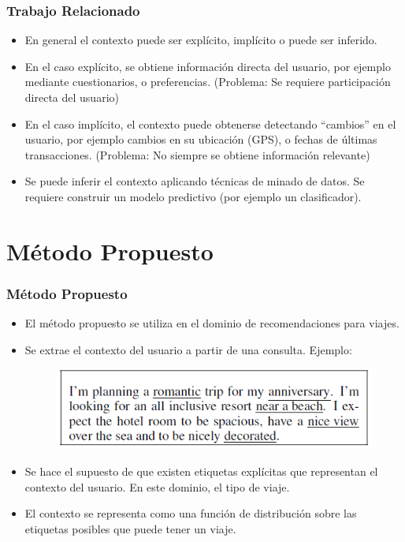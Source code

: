 \documentclass{beamer}
\begin{document}

\begin{frame}
\frametitle{Trabajo Relacionado}
\begin{itemize}
\item En general el contexto puede ser explícito, implícito o puede ser inferido.
\item En el caso explícito, se obtiene información directa del usuario, por ejemplo mediante cuestionarios, o preferencias. (Problema: Se requiere participación directa del usuario)
\item En el caso implícito, el contexto puede obtenerse detectando ``cambios'' en el usuario, por ejemplo cambios en su ubicación (GPS), o fechas de últimas transacciones. (Problema: No siempre se obtiene información relevante)
\item Se puede inferir el contexto aplicando técnicas de minado de datos. Se requiere construir un modelo predictivo (por ejemplo un clasificador).
\end{itemize}

\end{frame}


\section{Método Propuesto}
\begin{frame}
\frametitle{Método Propuesto}
\begin{itemize}
\item El método propuesto se utiliza en el dominio de recomendaciones para viajes.
\item Se extrae el contexto del usuario a partir de una consulta. Ejemplo:

\begin{figure}
\includegraphics[width=0.5\linewidth]{query.png}
\end{figure}

\item Se hace el supuesto de que existen etiquetas explícitas que representan el contexto del usuario. En este dominio, el tipo de viaje.

\item El contexto se representa como una función de distribución sobre las etiquetas posibles que puede tener un viaje.

\end{itemize}

\end{frame}
\end{document}
